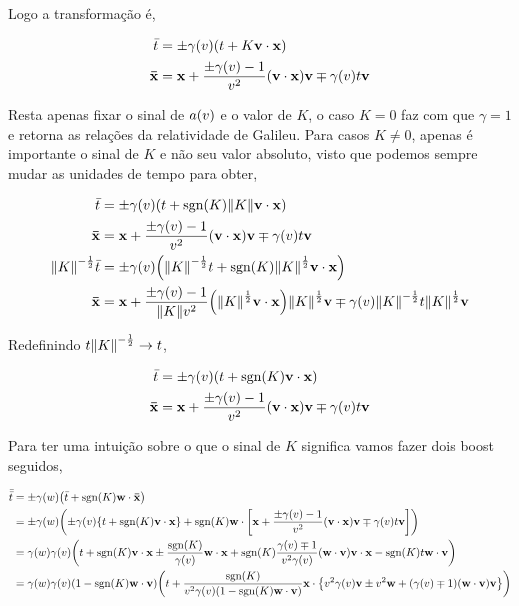 \documentclass[twoside]{amsart}
\newcommand{\sgn}[1]{\mbox{sgn}\qty(#1)}
\numberwithin{equation}{section}
\begin{document}
Logo a transformação é,

\begin{align}
    {\bar t}&=\pm\gamma\qty(v)\qty(t+K\vb v \cdot \vb x)\\
    \vb {\bar x}&= \vb x+\frac{\pm\gamma\qty(v)-1}{v^2}\qty(\vb v \cdot \vb x)\vb v\mp\gamma\qty(v)t \vb v
\end{align}

Resta apenas fixar o sinal de $a\qty(v)$ e o valor de $K$, o caso $K=0$ faz com que $\gamma=1$ e retorna as relações da relatividade de Galileu. Para casos $K\neq 0$, apenas é importante o sinal de $K$ e não seu valor absoluto, visto que podemos sempre mudar as unidades de tempo para obter,

\begin{align}
    {\bar t}&=\pm\gamma\qty(v)\qty(t+\sgn{K}\norm{K}\vb v \cdot \vb x)\\
    \vb {\bar x}&= \vb x+\frac{\pm\gamma\qty(v)-1}{v^2}\qty(\vb v \cdot \vb x)\vb v\mp\gamma\qty(v)t \vb v\\
    \norm{K}^{-\frac12}{\bar t}&=\pm\gamma\qty(v)\qty(\norm{K}^{-\frac12}t+\sgn{K}\norm{K}^\frac12\vb v \cdot \vb x)\\
    \vb {\bar x}&= \vb x+\frac{\pm\gamma\qty(v)-1}{\norm{K}v^2}\qty(\norm{K}^\frac12\vb v \cdot \vb x)\norm{K}^\frac12\vb v\mp\gamma\qty(v)\norm{K}^{-\frac12}t \norm{K}^\frac12\vb v 
\end{align}

Redefinindo $t\norm{K}^{-\frac12}\rightarrow t$,

\begin{align}
    {\bar t}&=\pm\gamma\qty(v)\qty(t+\sgn{K}\vb v \cdot \vb x)\\
    \vb {\bar x}&= \vb x+\frac{\pm\gamma\qty(v)-1}{v^2}\qty(\vb v \cdot \vb x)\vb v\mp\gamma\qty(v)t \vb v
\end{align}

Para ter uma intuição sobre o que o sinal de $K$ significa vamos fazer dois boost seguidos,

\begin{align}
    {\bar{\bar t}}&=\pm\gamma\qty(w)\qty({\bar t}+\sgn{K}\vb w\cdot\vb{\bar x})\\
    &=\pm\gamma\qty(w)\qty(\pm\gamma\qty(v)\qty{t+\sgn{K}\vb v\cdot\vb x}+\sgn{K}\vb w\cdot\qty[\vb x+\frac{\pm\gamma\qty(v)-1}{v^2}\qty(\vb v \cdot \vb x)\vb v\mp\gamma\qty(v)t \vb v])\\
    &=\gamma\qty(w)\gamma\qty(v)\qty(t+\sgn{K}\vb v\cdot\vb x\pm\frac{\sgn K}{\gamma\qty(v)}\vb w\cdot \vb x+\sgn K\frac{\gamma\qty(v)\mp1}{v^2\gamma\qty(v)}\qty(\vb w\cdot \vb v)\vb v\cdot \vb x-\sgn K t\vb w \cdot \vb v)\\
    &=\gamma\qty(w)\gamma\qty(v)\qty(1-\sgn K\vb w\cdot \vb v)\qty(t+\frac{\sgn K}{v^2\gamma\qty(v)\qty(1-\sgn K\vb w\cdot \vb v)} \vb x\cdot \qty{v^2\gamma\qty(v)\vb v\pm v^2\vb w+\qty(\gamma\qty(v)\mp 1)\qty(\vb w\cdot \vb v)\vb v})
\end{align}
\end{document}
